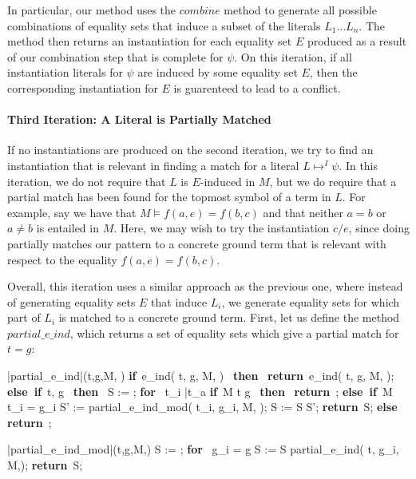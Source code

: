 \documentclass{llncs}
\def\IF{\qtab\keyword{if}\ }
\def\THEN{\ \keyword{then}\ }
\def\ELSE{\untab\qtab\keyword{else}\ }
\def\ELSEIF{\untab\qtab\keyword{else if}\ }
\def\FI{\untab}
\def\RETURN{\keyword{return}\ }
\def\ENDPROC{\untab}
\def\DOFOR{\qtab\keyword{for}\ }
\def\ENDFOR{\untab}
\def\keyword#1{\mbox{\normalshape\bf #1}}
\begin{document}
In particular, our method uses the $combine$ method to generate all possible combinations of equality sets that induce a subset of the literals $L_1 \ldots L_n$.
The method then returns an instantiation for each equality set $E$ produced as a result of our combination step that is complete for $\psi$.
On this iteration, if all instantiation literals for $\psi$ are induced by some equality set $E$, then the corresponding instantiation for $E$ is guarenteed to lead to a conflict.

\paragraph{Third Iteration: A Literal is Partially Matched}

If no instantiations are produced on the second iteration, we try to find an instantiation that is relevant in finding a match for a literal $L \mapsto^I \psi$.
In this iteration, we do not require that $L$ is $E$-induced in $M$, but we do require that a partial match has been found for the topmost symbol of a term in $L$.
For example, say we have that $M \models f( a, e ) = f( b, c )$ and that neither $a = b$ or $a \neq b$ is entailed in $M$.  
Here, we may wish to try the instantiation $c/e$, since doing partially matches our pattern to a concrete ground term that is relevant with respect to the equality $f( a, e ) = f( b, c )$.

Overall, this iteration uses a similar approach as the previous one, where instead of generating equality sets $E$ that induce $L_i$, we generate equality sets for which part of $L_i$ is matched to a concrete ground term.
First, let us define the method $partial\_e\_ind$, which returns a set of equality sets which give a partial match for $t = g$:

\begin{minipage}[t]{.4\linewidth}
\begin{program}
\PROC |partial\_e\_ind|(t,g,M, \psi) \BODY
\IF e\_ind( t, g, M, \psi ) \neq \emptyset \THEN
  \RETURN e\_ind( t, g, M, \psi );
\ELSEIF t, g  \THEN
  S := \emptyset;
  \DOFOR {} t_i  \bar{t_a} 
    \IF M \models t \neq g \THEN
      \RETURN \emptyset;
    \ELSEIF M \not\models t_i = g_i
      S' := partial\_e\_ind\_mod( t_i, g_i, M, \psi );
      S := S \cup S';
    \FI
  \ENDFOR
  \RETURN S;
\ELSE
  \RETURN \emptyset;
\FI
\ENDPROC
\end{program}
\end{minipage}
\begin{minipage}[t]{.4\linewidth}
\begin{program}
\PROC |partial\_e\_ind\_mod|(t,g,M,\psi) \BODY
  S := \emptyset;
  \DOFOR {} g_i = g
    S := S \cup partial\_e\_ind( t, g_i, M,\psi );
  \ENDFOR
  \RETURN S;
\ENDPROC
\end{program}
\end{minipage}
\end{document}
